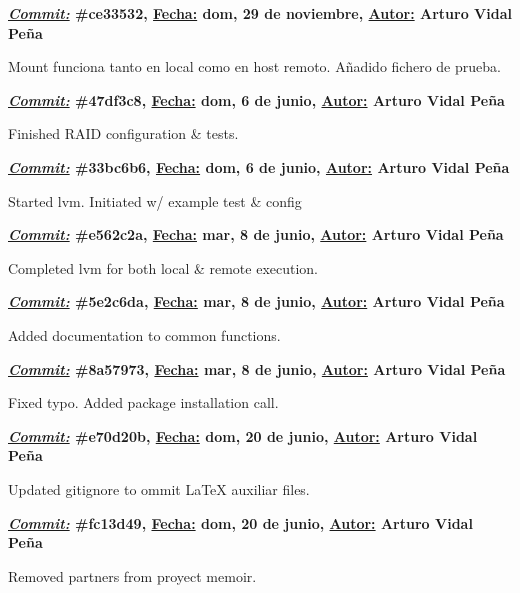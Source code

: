 \item \textbf{\underline{\textit{Commit:}} \#ce33532, \underline{Fecha:} dom, 29 de noviembre, \underline{Autor:} Arturo Vidal Peña}\\\item[] Mount funciona tanto en local como en host remoto. Añadido fichero de prueba.\\
\item \textbf{\underline{\textit{Commit:}} \#47df3c8, \underline{Fecha:} dom,  6 de junio, \underline{Autor:} Arturo Vidal Peña}\\\item[] Finished RAID configuration \& tests.\\
\item \textbf{\underline{\textit{Commit:}} \#33bc6b6, \underline{Fecha:} dom,  6 de junio, \underline{Autor:} Arturo Vidal Peña}\\\item[] Started lvm. Initiated w/ example test \& config\\
\item \textbf{\underline{\textit{Commit:}} \#e562c2a, \underline{Fecha:} mar,  8 de junio, \underline{Autor:} Arturo Vidal Peña}\\\item[] Completed lvm for both local \& remote execution.\\
\item \textbf{\underline{\textit{Commit:}} \#5e2c6da, \underline{Fecha:} mar,  8 de junio, \underline{Autor:} Arturo Vidal Peña}\\\item[] Added documentation to common functions.\\
\item \textbf{\underline{\textit{Commit:}} \#8a57973, \underline{Fecha:} mar,  8 de junio, \underline{Autor:} Arturo Vidal Peña}\\\item[] Fixed typo. Added package installation call.\\
\item \textbf{\underline{\textit{Commit:}} \#e70d20b, \underline{Fecha:} dom, 20 de junio, \underline{Autor:} Arturo Vidal Peña}\\\item[] Updated gitignore to ommit LaTeX auxiliar files.\\
\item \textbf{\underline{\textit{Commit:}} \#fc13d49, \underline{Fecha:} dom, 20 de junio, \underline{Autor:} Arturo Vidal Peña}\\\item[] Removed partners from proyect memoir.\\